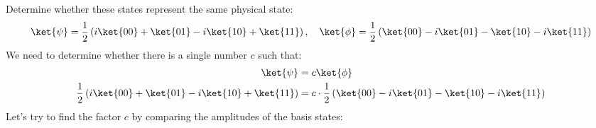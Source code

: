 \highspace
\exercise Determine whether these states represent the same physical state:
\begin{equation*}
    \ket{\psi} = \frac{1}{2} \left(i\ket{00} + \ket{01} - i\ket{10} + \ket{11}\right), \quad
    \ket{\phi} = \frac{1}{2} \left(\ket{00} - i\ket{01} - \ket{10} - i\ket{11}\right)
\end{equation*}
\solution We need to determine whether there is a single number $c$ such that:
\begin{equation*}
    \begin{aligned}
        \ket{\psi} &= c \ket{\phi} \\
        \frac{1}{2} \left(i\ket{00} + \ket{01} - i\ket{10} + \ket{11}\right) &= c \cdot \frac{1}{2} \left(\ket{00} - i\ket{01} - \ket{10} - i\ket{11}\right)
    \end{aligned}
\end{equation*}
Let's try to find the factor $c$ by comparing the amplitudes of the basis states:
